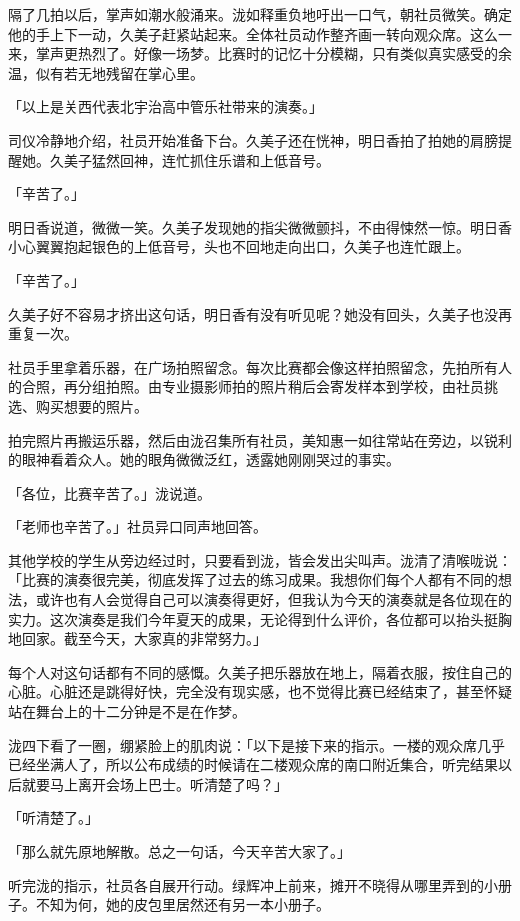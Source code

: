\documentclass[UTF8]{ctexart}
\begin{document}
    隔了几拍以后，掌声如潮水般涌来。泷如释重负地吁出一口气，朝社员微笑。确定他的手上下一动，久美子赶紧站起来。全体社员动作整齐画一转向观众席。这么一来，掌声更热烈了。好像一场梦。比赛时的记忆十分模糊，只有类似真实感受的余温，似有若无地残留在掌心里。 

    「以上是关西代表北宇治高中管乐社带来的演奏。」 

    司仪冷静地介绍，社员开始准备下台。久美子还在恍神，明日香拍了拍她的肩膀提醒她。久美子猛然回神，连忙抓住乐谱和上低音号。 

    「辛苦了。」 

    明日香说道，微微一笑。久美子发现她的指尖微微颤抖，不由得悚然一惊。明日香小心翼翼抱起银色的上低音号，头也不回地走向出口，久美子也连忙跟上。 

    「辛苦了。」 

    久美子好不容易才挤出这句话，明日香有没有听见呢？她没有回头，久美子也没再重复一次。 

    社员手里拿着乐器，在广场拍照留念。每次比赛都会像这样拍照留念，先拍所有人的合照，再分组拍照。由专业摄影师拍的照片稍后会寄发样本到学校，由社员挑选、购买想要的照片。 

    拍完照片再搬运乐器，然后由泷召集所有社员，美知惠一如往常站在旁边，以锐利的眼神看着众人。她的眼角微微泛红，透露她刚刚哭过的事实。 

    「各位，比赛辛苦了。」泷说道。 

    「老师也辛苦了。」社员异口同声地回答。 

    其他学校的学生从旁边经过时，只要看到泷，皆会发出尖叫声。泷清了清喉咙说：「比赛的演奏很完美，彻底发挥了过去的练习成果。我想你们每个人都有不同的想法，或许也有人会觉得自己可以演奏得更好，但我认为今天的演奏就是各位现在的实力。这次演奏是我们今年夏天的成果，无论得到什么评价，各位都可以抬头挺胸地回家。截至今天，大家真的非常努力。」 

    每个人对这句话都有不同的感慨。久美子把乐器放在地上，隔着衣服，按住自己的心脏。心脏还是跳得好快，完全没有现实感，也不觉得比赛已经结束了，甚至怀疑站在舞台上的十二分钟是不是在作梦。 

    泷四下看了一圈，绷紧脸上的肌肉说：「以下是接下来的指示。一楼的观众席几乎已经坐满人了，所以公布成绩的时候请在二楼观众席的南口附近集合，听完结果以后就要马上离开会场上巴士。听清楚了吗？」 

    「听清楚了。」 

    「那么就先原地解散。总之一句话，今天辛苦大家了。」 

    听完泷的指示，社员各自展开行动。绿辉冲上前来，摊开不晓得从哪里弄到的小册子。不知为何，她的皮包里居然还有另一本小册子。 
\end{document}
